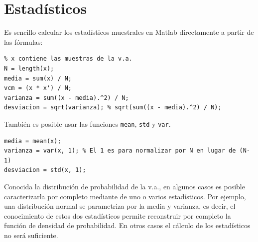 \documentclass[10pt,twoside,spanish,a4paper]{article}
\begin{document}
\newpage
\section*{Estadísticos}
Es sencillo calcular los estadísticos muestrales en Matlab directamente a partir de las fórmulas:
\begin{lstlisting}
% x contiene las muestras de la v.a.
N = length(x);
media = sum(x) / N;
vcm = (x * x') / N;
varianza = sum((x - media).^2) / N;
desviacion = sqrt(varianza); % sqrt(sum((x - media).^2) / N);
\end{lstlisting}

También es posible usar las funciones \texttt{mean}, \texttt{std} y \texttt{var}.
\begin{lstlisting}
media = mean(x);
varianza = var(x, 1); % El 1 es para normalizar por N en lugar de (N-1)
desviacion = std(x, 1);
\end{lstlisting}

Conocida la distribución de probabilidad de la v.a., en algunos casos es posible caracterizarla por completo mediante de uno o varios 
estadísticos. Por ejemplo, una distribución normal se parametriza por la media y varianza, es decir, el conocimiento de estos
dos estadísticos permite reconstruir por completo la función de densidad de probabilidad. En otros casos el cálculo de 
los estadísticos no será suficiente.

\newpage
\end{document}
